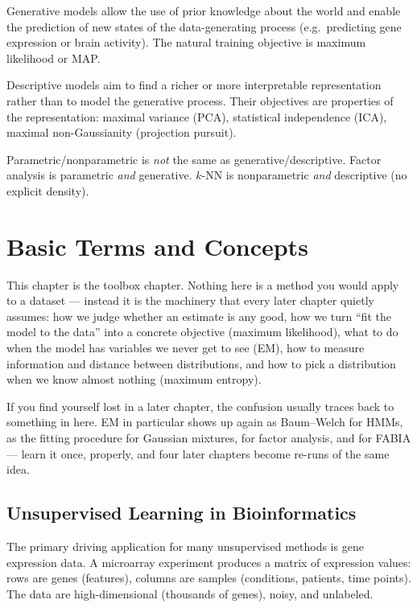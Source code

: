 \documentclass[11pt, oneside]{book}
\begin{document}
Generative models allow the use of prior knowledge about the world and enable the
prediction of new states of the data-generating process (e.g.\ predicting gene expression
or brain activity). The natural training objective is maximum likelihood or MAP.

Descriptive models aim to find a richer or more interpretable representation rather than
to model the generative process.
Their objectives are properties of the representation: maximal variance (PCA),
statistical independence (ICA), maximal non-Gaussianity (projection pursuit).

\begin{notebox}[title={Exam trap}]
Parametric/nonparametric is \emph{not} the same as generative/descriptive.
Factor analysis is parametric \emph{and} generative.
$k$-NN is nonparametric \emph{and} descriptive (no explicit density).
\end{notebox}


\chapter{Basic Terms and Concepts}

This chapter is the toolbox chapter.
Nothing here is a method you would apply to a dataset --- instead it is the
machinery that every later chapter quietly assumes: how we judge whether an
estimate is any good, how we turn ``fit the model to the data'' into a concrete
objective (maximum likelihood), what to do when the model has variables we never
get to see (EM), how to measure information and distance between distributions,
and how to pick a distribution when we know almost nothing (maximum entropy).

If you find yourself lost in a later chapter, the confusion usually traces back
to something in here.
EM in particular shows up again as Baum--Welch for HMMs, as the fitting procedure
for Gaussian mixtures, for factor analysis, and for FABIA --- learn it once,
properly, and four later chapters become re-runs of the same idea.

\section{Unsupervised Learning in Bioinformatics}

The primary driving application for many unsupervised methods is gene expression data.
A microarray experiment produces a matrix of expression values: rows are genes (features),
columns are samples (conditions, patients, time points).
The data are high-dimensional (thousands of genes), noisy, and unlabeled.
\end{document}
